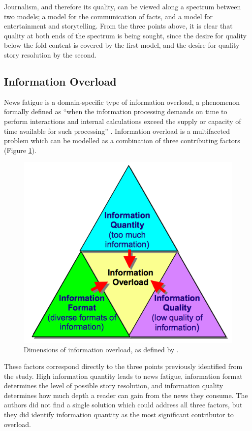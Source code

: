  Journalism, and therefore its quality, can be viewed along a spectrum between two models; a model for the communication of facts, and a model for entertainment and storytelling. From the three points above, it is clear that quality at both ends of the spectrum is being sought, since the desire for quality below-the-fold content is covered by the first model, and the desire for quality story resolution by the second.

\subsection{Information Overload \label{sec:information-overload}}

News fatigue is a domain-specific type of information overload, a phenomenon formally defined as ``when the information processing demands on time to perform interactions and internal calculations exceed the supply or capacity of time available for such processing'' \citep[p.206]{InformationOverloadATemporalApproach}. Information overload is a multifaceted problem which can be modelled as a combination of three contributing factors (Figure \ref{fig:dimensions}).

\begin{figure}[htbp!]
	\centering
	\includegraphics[width=.6\textwidth]{img/lit-survey/overload-model.png}
	\caption{Dimensions of information overload, as defined by \citet{TowardsAnOptimalResolutionToInformationOverload}.}
	\label{fig:dimensions}
\end{figure}

These factors correspond directly to the three points previously identified from the \citeauthor{anewmodelfornews} study. High information quantity leads to news fatigue, information format determines the level of possible story resolution, and information quality determines how much depth a reader can gain from the news they consume. The authors did not find a single solution which could address all three factors, but they did identify information quantity as the most significant contributor to overload.

